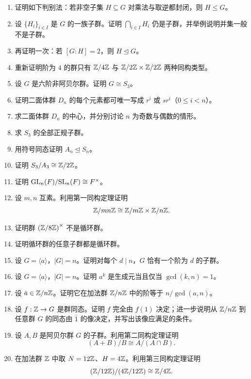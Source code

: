 \begin{enumerate}[start=31, label=\textbf{习题6.\arabic*.}, leftmargin=7em]
  \item \medium 证明如下判别法：若非空子集 $H\subseteq G$ 对乘法与取逆都封闭，则 $H\le G$。
  \item \medium 设 $\{H_i\}_{i\in I}$ 是 $G$ 的一族子群。证明 $\bigcap_{i\in I}H_i$ 仍是子群，并举例说明并集一般不是子群。
  \item \medium 再证明一次：若 $[G:H]=2$，则 $H\trianglelefteq G$。
  \item \medium 重新证明阶为 $4$ 的群只有 $\mathbb{Z}/4\mathbb{Z}$ 与 $\mathbb{Z}/2\mathbb{Z}\times\mathbb{Z}/2\mathbb{Z}$ 两种同构类型。
  \item \medium 设 $G$ 是六阶非阿贝尔群。证明 $G\cong S_3$。
  \item \medium 证明二面体群 $D_n$ 的每个元素都可唯一写成 $r^i$ 或 $sr^i$（$0\le i<n$）。
  \item \medium 求二面体群 $D_n$ 的中心，并分别讨论 $n$ 为奇数与偶数的情形。
  \item \medium 求 $S_3$ 的全部正规子群。
  \item \medium 用符号同态证明 $A_n\trianglelefteq S_n$。
  \item \medium 证明 $S_3/A_3 \cong \mathbb{Z}/2\mathbb{Z}$。
  \item \medium 证明 $\mathrm{GL}_n(F)/\mathrm{SL}_n(F) \cong F^\times$。
  \item \medium 设 $m,n$ 互素。利用第一同构定理证明
  \[
    \mathbb{Z}/mn\mathbb{Z} \cong \mathbb{Z}/m\mathbb{Z} \times \mathbb{Z}/n\mathbb{Z}.
  \]
  \item \medium 证明群 $\left(\mathbb{Z}/8\mathbb{Z}\right)^\times$ 不是循环群。
  \item \medium 证明循环群的任意子群都是循环群。
  \item \medium 设 $G=\langle a \rangle$，$|G|=n$。证明对每个 $d\mid n$，$G$ 恰有一个阶为 $d$ 的子群。
  \item \medium 设 $G=\langle a \rangle$，$|G|=n$。证明 $a^k$ 是生成元当且仅当 $\gcd(k,n)=1$。
  \item \medium 设 $\bar a\in \mathbb{Z}/n\mathbb{Z}$。证明它在加法群 $\mathbb{Z}/n\mathbb{Z}$ 中的阶等于 $n/\gcd(a,n)$。
  \item \medium 设 $f:\mathbb{Z}\to G$ 是群同态。证明 $f$ 完全由 $f(1)$ 决定；进一步说明从 $\mathbb{Z}/n\mathbb{Z}$ 到任意群 $G$ 的同态由 $\bar 1$ 的像决定，并写出该像应满足的条件。
  \item \medium 设 $A,B$ 是阿贝尔群 $G$ 的子群。利用第二同构定理证明
  \[
    (A+B)/B \cong A/(A\cap B).
  \]
  \item \medium 在加法群 $\mathbb{Z}$ 中取 $N=12\mathbb{Z}$、$H=4\mathbb{Z}$。利用第三同构定理证明
  \[
    (\mathbb{Z}/12\mathbb{Z})/(4\mathbb{Z}/12\mathbb{Z}) \cong \mathbb{Z}/4\mathbb{Z}.
\]
\end{enumerate}
